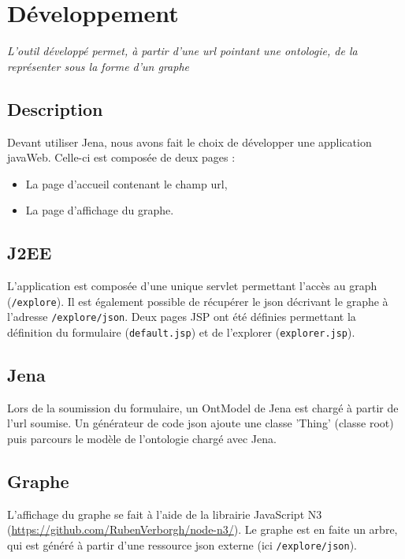 \section{Développement}

\emph{L'outil développé permet, à partir d'une url pointant une ontologie, de la représenter sous la forme d'un graphe
}

\subsection{Description}

Devant utiliser Jena, nous avons fait le choix de développer une application javaWeb. Celle-ci est composée de deux pages :
\begin{itemize}
    \item La page d'accueil contenant le champ url,
    \item La page d'affichage du graphe.
\end{itemize}

\subsection{J2EE}

L'application est composée d'une unique servlet permettant l'accès au graph (\texttt{/explore}). Il est également possible de récupérer le json décrivant le graphe à l'adresse \texttt{/explore/json}. Deux pages JSP ont été définies permettant la définition du formulaire (\texttt{default.jsp}) et de l'explorer (\texttt{explorer.jsp}).

\subsection{Jena}

Lors de la soumission du formulaire, un OntModel de Jena est chargé à partir de l'url soumise. Un générateur de code json ajoute une classe 'Thing' (classe root) puis parcours le modèle de l'ontologie chargé avec Jena.

\subsection{Graphe}

L'affichage du graphe se fait à l'aide de la librairie JavaScript N3 (\url{https://github.com/RubenVerborgh/node-n3/}). Le graphe est en faite un arbre, qui est généré à partir d'une ressource json externe (ici \texttt{/explore/json}).

